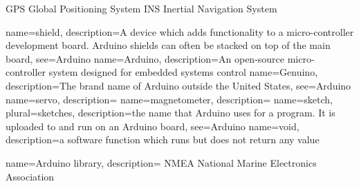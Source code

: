 %
%

{GPS}
{Global Positioning System}
{INS}
{Inertial Navigation System}

{name=shield,
description={A device which adds functionality to a micro-controller development board. Arduino shields can often be stacked on top of the main board},
see={Arduino}
}
{name=Arduino,
description={An open-source micro-controller system designed for embedded systems control}
}
{name=Genuino,
description={The brand name of Arduino outside the United States},
see={Arduino}
}
{name=servo,
description={}
}
{name=magnetometer,
description={}
}
{name=sketch,
plural={sketches},
description={the name that Arduino uses for a program. It is uploaded to and run on an Arduino board},
see={Arduino}
}
{name=void,
description={a software function which runs but does not return any value}
}

{name=Arduino library,
description={}
}
{NMEA}
{National Marine Electronics Association}
